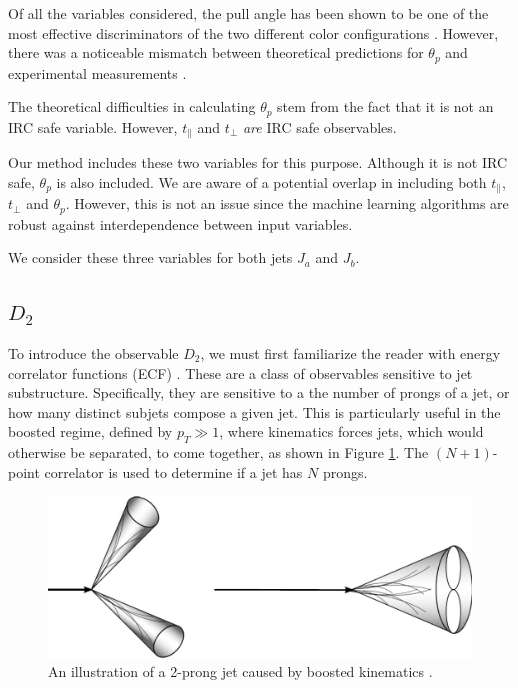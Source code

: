 \documentclass[10pt,a4paper]{book}
\begin{document}
Of all the variables considered, the pull angle has been shown to be one of the most effective discriminators of the two different color configurations \cite{Gallicchio:2010sw}. However, there was a noticeable mismatch between theoretical predictions for $\theta_p$ and experimental measurements \cite{Larkoski:2019urm}. 

The theoretical difficulties in calculating $\theta_p$ stem from the fact that it is not an IRC safe variable. However, $t_\parallel$ and $t_\perp$ \emph{are} IRC safe observables. 

Our method includes these two variables for this purpose. Although it is not IRC safe, $\theta_p$ is also included. We are aware of a potential overlap in including both $t_\parallel$, $t_\perp$ and $\theta_p$. However, this is not an issue since the machine learning algorithms are robust against interdependence between input variables. 

We consider these three variables for both jets $J_a$ and $J_b$. 

\subsection{$D_2$}

To introduce the observable $D_2$, we must first familiarize the reader with energy correlator functions (ECF) \cite{Larkoski:2013eya}. These are a class of observables sensitive to jet substructure. Specifically, they are sensitive to a the number of prongs of a jet, or how many distinct subjets compose a given jet. This is particularly useful in the boosted regime, defined by $p_T \gg 1$, where kinematics forces jets, which would otherwise be separated, to come together, as shown in Figure \ref{two pronged boost}. The $(N+1)$-point correlator is used to determine if a jet has $N$ prongs.

\begin{figure}[ht]
\centering
\includegraphics[scale=0.35]{ch4_images/two_prong}
\caption{An illustration of a 2-prong jet caused by boosted kinematics \cite{jet_image}.}
\label{two pronged boost}
\end{figure}
\end{document}
